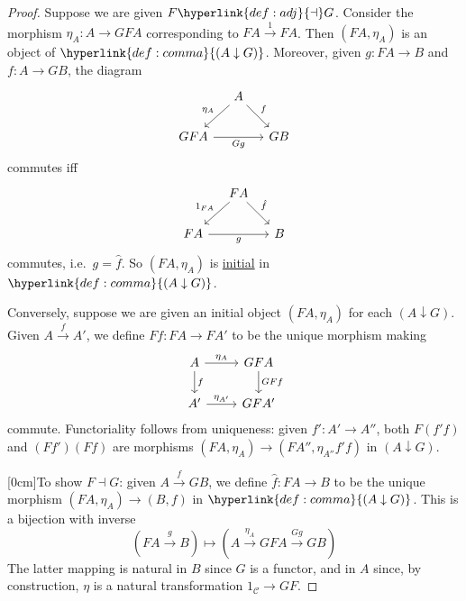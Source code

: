\documentclass{article}
\begin{document}
\begin{proof}
  Suppose we are given $F \hyperlink{def:adj}{\dashv} G$.
  Consider the morphism $\eta_A: A \to GFA$ corresponding to $FA \xrightarrow{1} FA$.
  Then $(FA, \eta_A)$ is an object of $\hyperlink{def:comma}{(A \downarrow G)}$.
  Moreover, given $g: FA \to B$ and $f: A \to GB$, the diagram
  \begin{equation*}
    \begin{tikzcd}[column sep=small]
      & A \arrow[ld, "\eta_A"'] \arrow[rd, "f"] &  \\
      GFA \arrow[rr, "Gg"'] &  & GB
    \end{tikzcd}
  \end{equation*}
  commutes iff
  \begin{equation*}
    \begin{tikzcd}[column sep=small]
      & FA \arrow[ld, "1_{FA}"'] \arrow[rd, "\hat{f}"] &  \\
      FA \arrow[rr, "g"'] &  & B
    \end{tikzcd}
  \end{equation*}
  commutes, i.e.\ $g = \hat{f}$.
  So $(FA, \eta_A)$ is \hyperlink{def:initial}{initial} in $\hyperlink{def:comma}{(A \downarrow G)}$.

  Conversely, suppose we are given an initial object $(FA, \eta_A)$ for each $(A \downarrow G)$.
  Given $A \xrightarrow{f} A'$, we define $Ff: FA \to FA'$ to be the unique morphism making
  \begin{equation*}
    \begin{tikzcd}
      A \arrow[d, "f"] \arrow[r, "\eta_A"] & GFA \arrow[d, "GFf"] \\
      A' \arrow[r, "\eta_{A'}"] & GFA'
    \end{tikzcd}
  \end{equation*}
  commute.
  Functoriality follows from uniqueness: given $f': A' \to A''$, both $F(f'f)$ and $(Ff')(Ff)$ are morphisms $(FA, \eta_A) \to (FA'', \eta_{A''}f'f)$ in $(A \downarrow G)$.

  [0cm]To show $F \dashv G$: given $A \xrightarrow{f} GB$, we define $\hat{f}: FA \to B$ to be the unique morphism $(FA, \eta_A) \to (B, f)$ in $\hyperlink{def:comma}{(A \downarrow G)}$.
  This is a bijection with inverse
  \begin{equation*}
    (FA \xrightarrow{g} B) \mapsto (A \xrightarrow{\eta_A} GFA \xrightarrow{Gg} GB)
  \end{equation*}
  The latter mapping is natural in $B$ since $G$ is a functor, and in $A$ since, by construction, $\eta$ is a natural transformation $1_\mathscr{C} \to GF$.
\end{proof}
\end{document}
